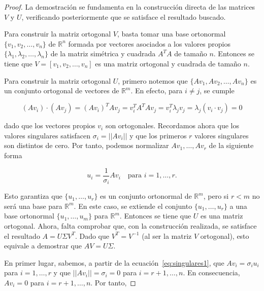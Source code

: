 \begin{proof}
    La demostración se fundamenta en la construcción directa de las matrices $V$ y $U$, verificando posteriormente que se satisface el resultado buscado.

    Para construir la matriz ortogonal $V$, basta tomar una base ortonormal $\{v_1, v_2, \ldots, v_n \}$ de $\mathbb{R}^{n}$ formada por vectores asociados a los valores propios $\{\lambda_1, \lambda_2, \ldots, \lambda_n\}$ de la matriz simétrica y cuadrada $A^{T}A$ de tamaño $n$. Entonces se tiene que $V = [v_1, v_2, \ldots, v_n]$ es una matriz ortogonal y cuadrada de tamaño $n$.

    Para construir la matriz ortogonal $U$, primero notemos que $\{Av_1, Av_2, \ldots, Av_n \}$ es un conjunto ortogonal de vectores de $\mathbb{R}^{m}$. En efecto, para $i \neq j$, se cumple

    \[ (Av_i)\cdot(Av_j) = (Av_i)^{T}Av_j=v_{i}^{T}A^{T}Av_j = v_{i}^{T}\lambda_j v_j=\lambda_j(v_i \cdot v_j) = 0\]

    dado que los vectores propios $v_i$ son ortogonales. Recordamos ahora que los valores singulares satisfacen $\sigma_i = ||Av_i||$ y que los primeros $r$ valores singulares son distintos de cero. Por tanto, podemos normalizar $Av_1, \ldots, Av_r$ de la siguiente forma

    \begin{equation}
        u_i = \frac{1}{\sigma_i} A v_i \quad \text{para } i = 1, \ldots, r.
        \label{eq:singulares1}
    \end{equation}
    

    Esto garantiza que $\{ u_1, \ldots, u_r\}$ es un conjunto ortonormal de $\mathbb{R}^{m}$, pero si $r < m$ no será una base para $\mathbb{R}^{m}$. En este caso, se extiende el conjunto $\{u_1, \ldots, u_r \}$ a una base ortonormal $\{u_1, \ldots, u_m \}$ para $\mathbb{R}^{m}$. Entonces se tiene que $U$ es una matriz ortogonal. Ahora, falta comprobar que, con la construcción realizada, se satisface el resultado $A = U \Sigma V^{T}$. Dado que $V^{T} = V^{-1}$ (al ser la matriz $V$ ortogonal), esto equivale a demostrar que $AV = U\Sigma$.

    En primer lugar, sabemos, a partir de la ecuación~\eqref{eq:singulares1}, que $Av_i=\sigma_i u_i$ para $i=1, \ldots, r$ y que $||A v_i|| = \sigma_i = 0$ para $i=r+1, \ldots,n$. En consecuencia, $Av_i = 0$ para $i=r+1, \ldots,n$. Por tanto, 


\end{proof}

